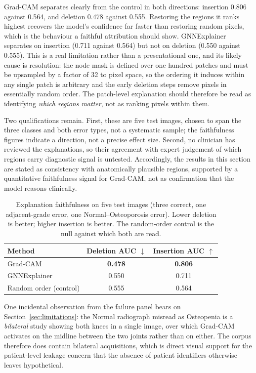 \documentclass[journal]{IEEEtran}
\begin{document}
Grad-CAM separates clearly from the control in both directions: insertion 0.806
against 0.564, and deletion 0.478 against 0.555. Restoring the regions it ranks
highest recovers the model's confidence far faster than restoring random pixels,
which is the behaviour a faithful attribution should show. GNNExplainer
separates on insertion (0.711 against 0.564) but not on deletion (0.550 against
0.555). This is a real limitation rather than a presentational one, and its
likely cause is resolution: the node mask is defined over one hundred patches
and must be upsampled by a factor of 32 to pixel space, so the ordering it
induces within any single patch is arbitrary and the early deletion steps remove
pixels in essentially random order. The patch-level explanation should therefore
be read as identifying \emph{which regions matter}, not as ranking pixels within
them.

Two qualifications remain. First, these are five test images, chosen to span the
three classes and both error types, not a systematic sample; the faithfulness
figures indicate a direction, not a precise effect size. Second, no clinician
has reviewed the explanations, so their agreement with expert judgement of which
regions carry diagnostic signal is untested. Accordingly, the results in this
section are stated as consistency with anatomically plausible regions,
supported by a quantitative faithfulness signal for Grad-CAM, not as
confirmation that the model reasons clinically.

\begin{table}[!t]
\centering
\caption{Explanation faithfulness on five test images (three correct, one
adjacent-grade error, one Normal--Osteoporosis error). Lower deletion is better;
higher insertion is better. The random-order control is the null against which
both are read.}
\label{tab:faithfulness}
\footnotesize
\begin{tabular}{@{}l c c@{}}
\toprule
\textbf{Method} & \textbf{Deletion AUC $\downarrow$} & \textbf{Insertion AUC $\uparrow$} \\
\midrule
Grad-CAM        & \textbf{0.478} & \textbf{0.806} \\
GNNExplainer    & 0.550 & 0.711 \\
Random order (control) & 0.555 & 0.564 \\
\bottomrule
\end{tabular}
\end{table}

One incidental observation from the failure panel bears on
Section~\ref{sec:limitations}: the Normal radiograph misread as Osteopenia is a
\emph{bilateral} study showing both knees in a single image, over which
Grad-CAM activates on the midline between the two joints rather than on either.
The corpus therefore does contain bilateral acquisitions, which is direct visual
support for the patient-level leakage concern that the absence of patient
identifiers otherwise leaves hypothetical.
\end{document}
